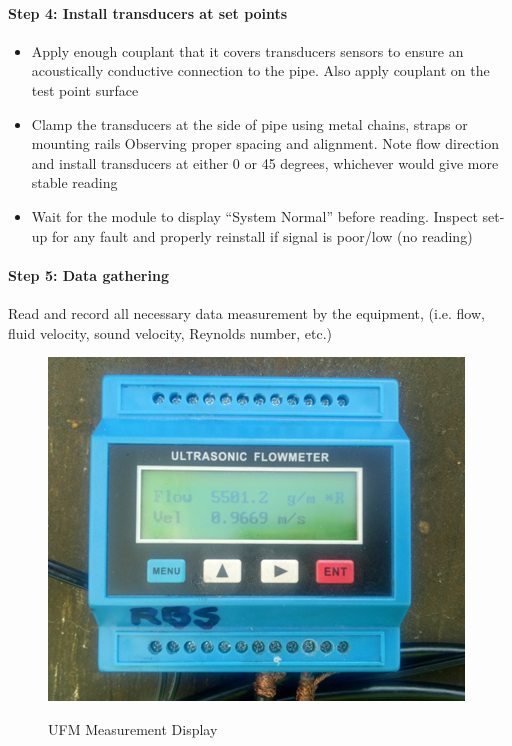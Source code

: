 \paragraph{Step 4: Install transducers at set points}
\begin{itemize}
	\item Apply enough couplant that it covers transducers sensors to ensure an acoustically conductive connection to the pipe. Also apply couplant on the test point surface %
	\item Clamp the transducers at the side of pipe using metal chains, straps or mounting rails Observing proper spacing and alignment. Note flow direction and install transducers at either 0 or 45 degrees, whichever would give more stable reading %
	\item Wait for the module to display “System Normal” before reading. Inspect set-up for any fault and properly reinstall if signal is poor/low (no reading)
\end{itemize}


\paragraph{Step 5: Data gathering}
Read and record all necessary data measurement by the equipment, (i.e. flow, fluid velocity, sound velocity, Reynolds number, etc.) 

\begin{figure}[!htb]
	\includegraphics[scale=1.3]{figures/fig_ch02_flowmeasurement07} \\
	\caption{UFM Measurement Display}
	\label{ch02_flowmeasurement07} 
\end{figure}

